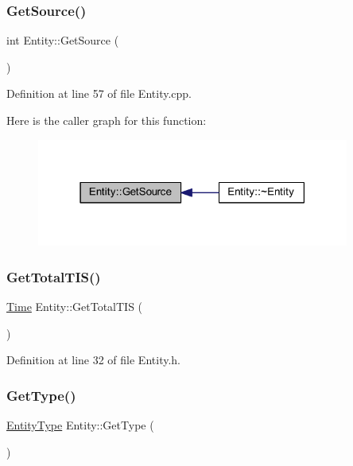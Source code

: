 \subsubsection{\texorpdfstring{Get\+Source()}{GetSource()}}
{\footnotesize\ttfamily int Entity\+::\+Get\+Source (\begin{DoxyParamCaption}{ }\end{DoxyParamCaption})}



Definition at line 57 of file Entity.\+cpp.

Here is the caller graph for this function\+:
\nopagebreak
\begin{figure}[H]
\begin{center}
\leavevmode
\includegraphics[width=291pt]{class_entity_a22d4fe26b229f7720f5204eeadffb1b2_icgraph}
\end{center}
\end{figure}
\mbox{\label{class_entity_abaed105c13bcd367823d4c1167e3042a}} 
\subsubsection{\texorpdfstring{Get\+Total\+T\+I\+S()}{GetTotalTIS()}}
{\footnotesize\ttfamily \hyperlink{_simulation_executive_8h_ac2d3e0ba793497bcca555c7c2cf64ff3}{Time} Entity\+::\+Get\+Total\+T\+IS (\begin{DoxyParamCaption}{ }\end{DoxyParamCaption})\hspace{0.3cm}{\ttfamily [inline]}}



Definition at line 32 of file Entity.\+h.

\mbox{\label{class_entity_a6618c119290b237bd6f9e903d029405d}} 
\subsubsection{\texorpdfstring{Get\+Type()}{GetType()}}
{\footnotesize\ttfamily \hyperlink{_entity_8h_ad79a57ed3105eb60d991a1aeb4a9dc44}{Entity\+Type} Entity\+::\+Get\+Type (\begin{DoxyParamCaption}{ }\end{DoxyParamCaption})}




